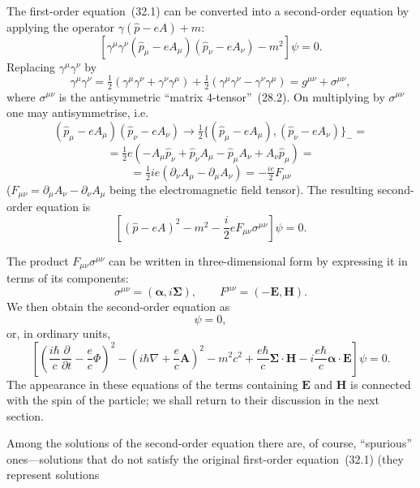The first-order equation~(32.1) can be converted into a second-order equation by applying the operator $\gamma(\widehat p - eA) + m$:
\[
[\gamma^\mu\gamma^\nu(\widehat p_\mu - eA_\mu)(\widehat p_\nu - eA_\nu) - m^2]\psi = 0.
\]
Replacing $\gamma^\mu\gamma^\nu$ by
\[
\gamma^\mu\gamma^\nu = \tfrac{1}{2}(\gamma^\mu\gamma^\nu + \gamma^\nu\gamma^\mu) + \tfrac{1}{2}(\gamma^\mu\gamma^\nu - \gamma^\nu\gamma^\mu) = g^{\mu\nu} + \sigma^{\mu\nu},
\]
where $\sigma^{\mu\nu}$ is the antisymmetric ``matrix 4-tensor''~(28.2). On multiplying by $\sigma^{\mu\nu}$ one may antisymmetrise, i.e.
\[
(\widehat p_\mu - eA_\mu)(\widehat p_\nu - eA_\nu) \to \tfrac{1}{2}\{(\widehat p_\mu - eA_\mu),(\widehat p_\nu - eA_\nu)\}_- =
\]
\[
= \tfrac{1}{2}e(-A_\mu\widehat p_\nu + \widehat p_\nu A_\mu - \widehat p_\mu A_\nu + A_\nu\widehat p_\mu) =
\]
\[
= \tfrac{1}{2}ie(\partial_\nu A_\mu - \partial_\mu A_\nu) = -\tfrac{ie}{2}F_{\mu\nu}
\]
($F_{\mu\nu} = \partial_\mu A_\nu - \partial_\nu A_\mu$ being the electromagnetic field tensor). The resulting second-order equation is
\begin{equation}
\left[(\widehat p - eA)^2 - m^2 - \frac{i}{2}eF_{\mu\nu}\sigma^{\mu\nu}\right]\psi = 0.
\tag{32.6}
\end{equation}

The product $F_{\mu\nu}\sigma^{\mu\nu}$ can be written in three-dimensional form by expressing it in terms of its components:
\[
\sigma^{\mu\nu} = (\boldsymbol{\alpha},i\boldsymbol{\Sigma}),\qquad F^{\mu\nu} = (-\mathbf{E},\mathbf{H}).
\]
We then obtain the second-order equation as
\begin{equation}
[(\widehat p - eA)^2 - m^2 + e\boldsymbol{\Sigma}\cdot\mathbf{H} - ie\boldsymbol{\alpha}\cdot\mathbf{E}]\psi = 0,
\tag{32.7}
\end{equation}
or, in ordinary units,
\begin{equation}
\left[\left(\frac{i\hbar}{c}\frac{\partial}{\partial t} - \frac{e}{c}\Phi\right)^2 - \left(i\hbar\nabla + \frac{e}{c}\mathbf{A}\right)^2 - m^2c^2 + \frac{e\hbar}{c}\boldsymbol{\Sigma}\cdot\mathbf{H} - i\frac{e\hbar}{c}\boldsymbol{\alpha}\cdot\mathbf{E}\right]\psi = 0.
\tag{32.7a}
\end{equation}
The appearance in these equations of the terms containing $\mathbf{E}$ and $\mathbf{H}$ is connected with the spin of the particle; we shall return to their discussion in the next section.

Among the solutions of the second-order equation there are, of course, ``spurious'' ones---solutions that do not satisfy the original first-order equation~(32.1) (they represent solutions

